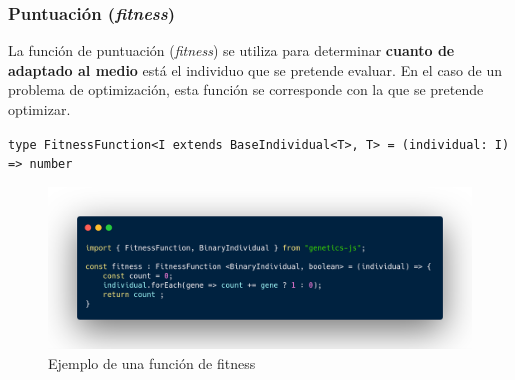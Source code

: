 \documentclass{beamer}
\begin{document}
\begin{frame}
\frametitle{Puntuación (\textit{fitness})}

La función de puntuación (\textit{fitness}) se utiliza para determinar \textbf{cuanto de adaptado al medio} está el individuo que se pretende evaluar. En el caso de un problema de optimización, esta función se corresponde con la que se pretende optimizar.

\begin{center}
    \texttt{type FitnessFunction<I extends BaseIndividual<T>, T> = (individual: I) => number}
\end{center}

\begin{figure}
    \centering
    \includegraphics[scale=0.20]{pres/img/desarrollo/fitness-example.png}
    \caption{Ejemplo de una función de fitness}
    \label{fig:my_label}
\end{figure}

\end{frame}
\end{document}
